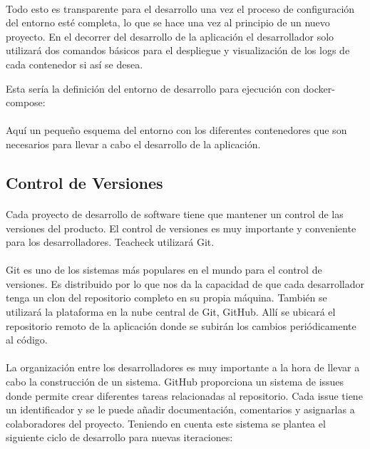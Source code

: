 \paragraph{}
Todo esto es transparente para el desarrollo una vez el proceso de
configuración del entorno esté completa, lo que se hace una vez al
principio de un nuevo proyecto. En el decorrer del desarrollo de la
aplicación el desarrollador solo utilizará dos comandos básicos para
el despliegue y visualización de los logs de cada contenedor si así se
desea.

Esta sería la definición del entorno de desarrollo para ejecución con
docker-compose:


\paragraph{}
Aquí un pequeño esquema del entorno con los diferentes contenedores
que son necesarios para llevar a cabo el desarrollo de la aplicación.

\subsection{Control de Versiones}
\paragraph{}
Cada proyecto de desarrollo de software tiene que mantener un control
de las versiones del producto. El control de versiones es muy
importante y conveniente para los desarrolladores.  Teacheck utilizará
Git.

\paragraph{}
Git es uno de los sistemas más populares en el mundo para el control
de versiones. Es distribuido por lo que nos da la capacidad de que
cada desarrollador tenga un clon del repositorio completo en su propia
máquina. También se utilizará la plataforma en la nube central de Git,
GitHub. Allí se ubicará el repositorio remoto de la aplicación donde
se subirán los cambios periódicamente al código.

\paragraph{}
La organización entre los desarrolladores es muy importante a la hora
de llevar a cabo la construcción de un sistema. GitHub proporciona un
sistema de issues donde permite crear diferentes tareas relacionadas
al repositorio. Cada issue tiene un identificador y se le puede añadir
documentación, comentarios y asignarlas a colaboradores del
proyecto. Teniendo en cuenta este sistema se plantea el siguiente
ciclo de desarrollo para nuevas iteraciones:

